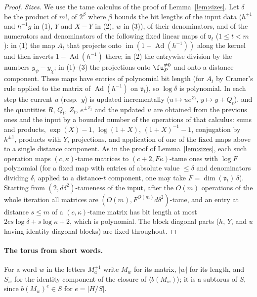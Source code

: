 \begin{proof}
\emph{Sizes.} We use the tame calculus of the proof of Lemma~\ref{lem:sizes}. Let $\delta$ be the
product of $m!$, of $2^{\beta}$ where $\beta$ bounds the bit lengths of the input data ($h^{\pm1}$ and
$h^{-1}g$ in (1), $Y$ and $X-Y$ in (2), $w$ in (3)), of their denominators, and of the numerators and
denominators of the following fixed linear maps of $\mathfrak v_t$ ($1\le t<m$): in (1) the map $A_t$ that
projects onto $\operatorname{im}(1-\operatorname{Ad}(h^{-1}))$ along the kernel and then inverts $1-\operatorname{Ad}(h^{-1})$ there; in (2) the
entrywise division by the numbers $y_\psi-y_\chi$; in (1)--(3) the projections onto $\fu_P^{\ne0}$ and
onto a distance component. These maps have entries of polynomial bit length (for $A_t$ by Cramer's
rule applied to the matrix of $\operatorname{Ad}(h^{-1})$ on $\mathfrak v_t$), so $\log\delta$ is polynomial. In
each step the current $u$ (resp.\ $y$) is updated incrementally ($u\mapsto ue^{Z_t}$, $y\mapsto y+Q_t$),
and the quantities $R$, $Q_t$, $Z_t$, $e^{\pm Z_t}$ and the updated $u$ are obtained from the previous
ones and the input by a bounded number of the operations of that calculus: sums and products,
$\exp(X)-1$, $\log(1+X)$, $(1+X)^{-1}-1$, conjugation by $h^{\pm1}$, products with $Y$, projections, and
application of one of the fixed maps above to a single distance component. As in the proof of
Lemma~\ref{lem:sizes}, each such operation maps $(c,\kappa)$-tame matrices to
$(c+2,F\kappa)$-tame ones with $\log F$ polynomial (for a fixed map with entries of absolute value
$\le\delta$ and denominators dividing $\delta$, applied to a distance-$t$ component, one may take
$F=\dim(\mathfrak v_t)\,\delta$). Starting from $(2,d\delta^2)$-tameness of the input, after the $O(m)$
operations of the whole iteration all matrices are $(O(m),F^{O(m)}d\delta^2)$-tame, and an entry at
distance $s\le m$ of a $(c,\kappa)$-tame matrix has bit length at most $2cs\log\delta+s\log\kappa+2$,
which is polynomial. The block diagonal parts ($h$, $Y$, and $u$ having identity diagonal blocks) are
fixed throughout.
\end{proof}

\paragraph{The torus from short words.} For a word $w$ in the letters $M_a^{\pm1}$ write $M_w$ for its
matrix, $|w|$ for its length, and $S_w$ for the identity component of the closure of
$\langle b(M_w)\rangle$; it is a subtorus of $S$, since $b(M_w)^e\in S$ for $e=|H/S|$.

